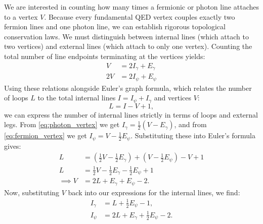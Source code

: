 We are interested in counting how many times a fermionic or photon line attaches to a vertex $V$. Because every fundamental QED vertex couples exactly two fermion lines and one photon line, we can establish rigorous topological conservation laws. We must distinguish between internal lines (which attach to two vertices) and external lines (which attach to only one vertex). Counting the total number of line endpoints terminating at the vertices yields:
\begin{align}
    V  & = 2I_{\gamma} + E_{\gamma} \label{eq:photon_vertex} \\
    2V & = 2I_{\psi} + E_{\psi} \label{eq:fermion_vertex}
\end{align}
Using these relations alongside Euler's graph formula, which relates the number of loops $L$ to the total internal lines $I = I_{\psi} + I_{\gamma}$ and vertices $V$:
\[
    L =  I - V + 1,
\]
we can express the number of internal lines strictly in terms of loops and external legs. From \eqref{eq:photon_vertex} we get $I_\gamma = \frac{1}{2}(V - E_\gamma)$, and from \eqref{eq:fermion_vertex} we get $I_\psi = V - \frac{1}{2}E_\psi$. Substituting these into Euler's formula gives:
\[
    \begin{aligned}
        L          & = \left( \frac{1}{2}V - \frac{1}{2}E_\gamma \right) + \left( V - \frac{1}{2}E_\psi \right) - V + 1 \\
        L          & = \frac{1}{2}V - \frac{1}{2}E_\gamma - \frac{1}{2}E_\psi + 1                                       \\
        \implies V & = 2L + E_\gamma + E_\psi - 2.
    \end{aligned}
\]
Now, substituting $V$ back into our expressions for the internal lines, we find:
\[
    \begin{aligned}
        I_{\gamma} & = L + \frac{1}{2}E_{\psi} - 1,               \\
        I_{\psi}   & = 2L + E_{\gamma} + \frac{1}{2}E_{\psi} - 2.
    \end{aligned}
\]

